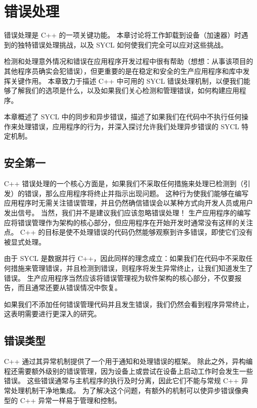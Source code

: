 \section{错误处理}
错误处理是 C++ 的一项关键功能。 本章讨论将工作卸载到设备（加速器）时遇到的独特错误处理挑战，以及 SYCL 如何使我们完全可以应对这些挑战。

检测和处理意外情况和错误在应用程序开发过程中很有帮助（想想：从事该项目的其他程序员确实会犯错误），但更重要的是在稳定和安全的生产应用程序和库中发挥关键作用。 本章致力于描述 C++ 中可用的 SYCL 错误处理机制，以便我们能够了解我们的选项是什么，以及如果我们关心检测和管理错误，如何构建应用程序。

本章概述了 SYCL 中的同步和异步错误，描述了如果我们在代码中不执行任何操作来处理错误，应用程序的行为，并深入探讨允许我们处理异步错误的 SYCL 特定机制。


\subsection{安全第一}
C++ 错误处理的一个核心方面是，如果我们不采取任何措施来处理已检测到（引发）的错误，那么应用程序将终止并指示出现问题。 这种行为使我们能够在编写应用程序时无需关注错误管理，并且仍然确信错误会以某种方式向开发人员或用户发出信号。 当然，我们并不是建议我们应该忽略错误处理！ 生产应用程序的编写应将错误管理作为架构的核心部分，但应用程序在开始开发时通常没有这样的关注点。 C++ 的目标是使不处理错误的代码仍然能够观察到许多错误，即使它们没有被显式处理。

由于 SYCL 是数据并行 C++，因此同样的理念成立：如果我们在代码中不采取任何措施来管理错误，并且检测到错误，则程序将发生异常终止，让我们知道发生了错误。 生产应用程序当然应该将错误管理视为软件架构的核心部分，不仅要报告，而且通常还要从错误情况中恢复。

\begin{remark}
	如果我们不添加任何错误管理代码并且发生错误，我们仍然会看到程序异常终止，这表明需要进行更深入的研究。
\end{remark}

\subsection{错误类型}
C++ 通过其异常机制提供了一个用于通知和处理错误的框架。 除此之外，异构编程还需要额外级别的错误管理，因为设备上或尝试在设备上启动工作时会发生一些错误。 这些错误通常与主机程序的执行及时分离，因此它们不能与常规 C++ 异常处理机制干净地集成。 为了解决这个问题，有额外的机制可以使异步错误像典型的 C++ 异常一样易于管理和控制。

